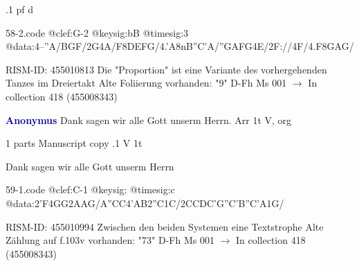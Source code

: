 \documentclass[twocolumn]{book}
\begin{document}
.1  pf  d  
\begin{filecontents*}{58-2.code}
@clef:G-2
@keysig:bB
@timesig:3
@data:4--''A/BGF/2G4A/F{8DEFG}/4.'A{8nB''C'A}/{''GAFG}4E/2F://4F/4.F{8GAG}/
\end{filecontents*}
\newline
%

\newline RISM-ID: 455010813
\newline Die "Proportion" ist eine Variante des vorhergehenden Tanzes im Dreiertakt
\newline Alte Foliierung vorhanden: "9"
\newline D-Fh  Ms 001
\newline $\rightarrow$ In collection 418 (455008343)

\newline \par \vspace{7pt} \textcolor{darkblue}{\textbf{Anonymus  }}
\newline Dank sagen wir alle Gott unserm Herrn. Arr  1t  
\newline V, org
\newline \begin{itshape}\end{itshape} 
\newline \textcolor{darkblue}{}  1 parts  
\newline Manuscript copy
.1  V  1t
\newline \begin{footnotesize} Dank sagen wir alle Gott unserm Herrn \end{footnotesize}  
\begin{filecontents*}{59-1.code}
@clef:C-1
@keysig:
@timesig:c
@data:2'F4GG2AAG/A''CC4'AB2''C1C/2CCDC'G''C'B''C'A1G/
\end{filecontents*}
\newline
%

\newline RISM-ID: 455010994
\newline Zwischen den beiden Systemen eine Textstrophe
\newline Alte Zählung auf f.103v vorhanden: "73"
\newline D-Fh  Ms 001
\newline $\rightarrow$ In collection 418 (455008343)
\end{document}
